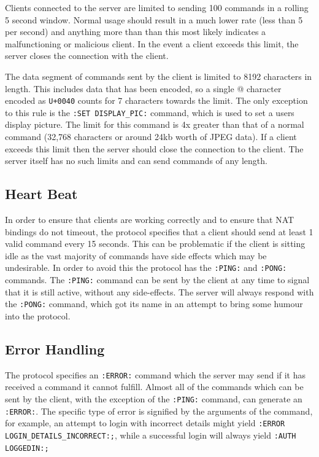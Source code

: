 Clients connected to the server are limited to sending 100 commands in a rolling 5 second window. Normal usage should result in a much lower rate (less than 5 per second) and anything more than than this most likely indicates a malfunctioning or malicious client. In the event a client exceeds this limit, the server closes the connection with the client. %

The data segment of commands sent by the client is limited to 8192 characters in length. This includes data that has been encoded, so a single @ character encoded as \texttt{\SLASH U+0040} counts for 7 characters towards the limit. The only exception to this rule is the \texttt{:SET DISPLAY\_PIC:} command, which is used to set a users display picture. The limit for this command is 4x greater than that of a normal command (32,768 characters or around 24kb worth of JPEG data). If a client exceeds this limit then the server should close the connection to the client. The server itself has no such limits and can send commands of any length.

\subsection{Heart Beat}

In order to ensure that clients are working correctly and to ensure that NAT bindings do not timeout, the protocol specifies that a client should send at least 1 valid command every 15 seconds. This can be problematic if the client is sitting idle as the vast majority of commands have side effects which may be undesirable. In order to avoid this the protocol has the \texttt{:PING:} and \texttt{:PONG:} commands. The \texttt{:PING:} command can be sent by the client at any time to signal that it is still active, without any side-effects. The server will always respond with the \texttt{:PONG:} command, which got its name in an attempt to bring some humour into the protocol.

\subsection{Error Handling}

The protocol specifies an \texttt{:ERROR:} command which the server may send if it has received a command it cannot fulfill. Almost all of the commands which can be sent by the client, with the exception of the \texttt{:PING:} command, can generate an \texttt{:ERROR:}. The specific type of error is signified by the arguments of the command, for example, an attempt to login with incorrect details might yield \texttt{:ERROR LOGIN\_DETAILS\_INCORRECT:;}, while a successful login will always yield \texttt{:AUTH LOGGEDIN:;}

